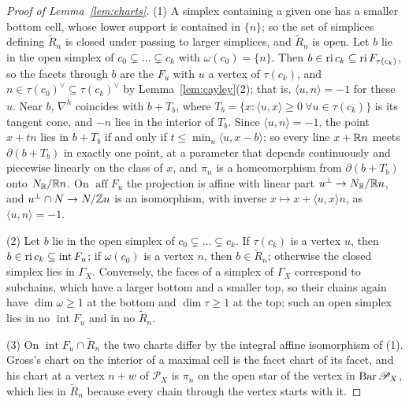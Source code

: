 \begin{proof}[Proof of Lemma~\ref{lem:charts}]
(1) A simplex containing a given one has a smaller bottom cell, whose lower support is contained in $\{n\}$; so the set of
simplices defining $\widetilde R_n$ is closed under passing to larger simplices, and $\widetilde R_n$ is open. Let $b$ lie
in the open simplex of $c_0\subsetneq\dots\subsetneq c_k$ with $\omega(c_0)=\{n\}$. Then $b\in\operatorname{ri} c_k\subseteq\operatorname{ri}
F_{\tau(c_k)}$, so the facets through $b$ are the $F_u$ with $u$ a vertex of $\tau(c_k)$, and $n\in\tau(c_0)^\vee\subseteq
\tau(c_k)^\vee$ by Lemma~\ref{lem:cayley}(2); that is, $\langle u,n\rangle=-1$ for these $u$. Near $b$, $\nabla^{\check h}$
coincides with $b+T_b$, where $T_b=\{x:\langle u,x\rangle\ge0\ \forall u\in\tau(c_k)\}$ is its tangent cone, and $-n$ lies
in the interior of $T_b$. Since $\langle u,n\rangle=-1$, the point $x+tn$ lies in $b+T_b$ if and only if
$t\le\min_u\langle u,x-b\rangle$; so every line $x+\mathbb R n$ meets $\partial(b+T_b)$ in exactly one point, at a parameter that
depends continuously and piecewise linearly on the class of $x$, and $\pi_n$ is a homeomorphism from $\partial(b+T_b)$
onto $N_\mathbb R/\mathbb R n$. On $\operatorname{aff}F_u$ the projection is affine with linear part $u^\perp\to N_\mathbb R/\mathbb R n$, and
$u^\perp\cap N\to N/\mathbb Z n$ is an isomorphism, with inverse $x\mapsto x+\langle u,x\rangle n$, as $\langle u,n\rangle=-1$.

(2) Let $b$ lie in the open simplex of $c_0\subsetneq\dots\subsetneq c_k$. If $\tau(c_k)$ is a vertex $u$, then $b\in\operatorname{ri}
c_k\subseteq\operatorname{int}F_u$; if $\omega(c_0)$ is a vertex $n$, then $b\in\widetilde R_n$; otherwise the closed
simplex lies in $\Gamma_X$. Conversely, the faces of a simplex of $\Gamma_X$ correspond to subchains, which have a larger
bottom and a smaller top, so their chains again have $\dim\omega\ge1$ at the bottom and $\dim\tau\ge1$ at the top; such an
open simplex lies in no $\operatorname{int}F_u$ and in no $\widetilde R_n$.

(3) On $\operatorname{int}F_u\cap\widetilde R_n$ the two charts differ by the integral affine isomorphism of (1). Gross's
chart on the interior of a maximal cell is the facet chart of its facet, and his chart at a vertex $n+w$ of $\mathscr P_X$
is $\pi_n$ on the open star of the vertex in $\operatorname{Bar}\mathscr P_X$, which lies in $\widetilde R_n$ because every chain
through the vertex starts with it.
\end{proof}

